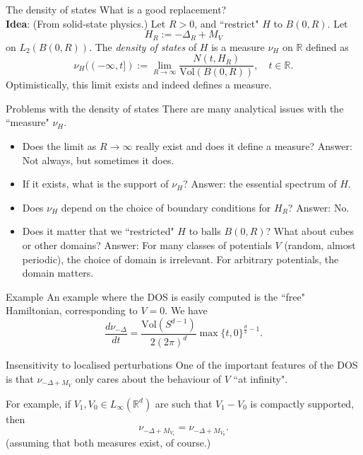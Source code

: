 \documentclass{beamer}
\numberwithin{equation}{section}
\theoremstyle{plain}
\theoremstyle{plain}
\theoremstyle{definition}
\theoremstyle{plain}
\theoremstyle{plain}
\theoremstyle{definition}
\newcommand{\Vol}{\mathrm{Vol}}
\newcommand{\Rl}{\mathbb{R}}
\begin{document}
\begin{frame}{The density of states}
    What is a good replacement?\\
    \pause
    {\bf Idea}: (From solid-state physics.) Let $R > 0$, and ``restrict" $H$ to $B(0,R).$ Let
    \[
        H_R := -\Delta_R + M_{V}
    \]
    on $L_2(B(0,R))$. The \emph{density of states} of $H$ is a measure $\nu_H$ on $\Rl$ defined as
    \[
        \nu_H((-\infty,t]) := \lim_{R\to \infty} \frac{N(t,H_R)}{\mathrm{Vol}(B(0,R))},\quad t \in \Rl.
    \] 
    Optimistically, this limit exists and indeed defines a measure. 
\end{frame}

\begin{frame}{Problems with the density of states}
    There are many analytical issues with the ``measure" $\nu_H$.
    \begin{itemize}
        \item{} Does the limit as $R\to\infty$ really exist and does it define a measure? \pause    Answer: Not always, but sometimes it does. \pause
        \item{} If it exists, what is the support of $\nu_H$? \pause   Answer: the essential spectrum of $H$. \pause
        \item{} Does $\nu_H$ depend on the choice of boundary conditions for $H_R$? \pause   Answer: No. \pause
        \item{} Does it matter that we ``restricted" $H$ to balls $B(0,R)$? What about cubes or other domains? \pause Answer: For many classes of potentials $V$ (random, almost periodic), the choice of domain is irrelevant. For arbitrary potentials, the domain matters.
    \end{itemize}
\end{frame}

\begin{frame}{Example}
    An example where the DOS is easily computed is the ``free" Hamiltonian, corresponding to $V = 0$. We have
    \begin{equation*}
        \frac{d\nu_{-\Delta}}{dt} = \frac{\Vol(S^{d-1})}{2(2\pi)^d}\max\{t,0\}^{\frac{d}{2}-1}.
    \end{equation*}
\end{frame}


\begin{frame}{Insensitivity to localised perturbations}
    One of the important features of the DOS is that $\nu_{-\Delta+M_V}$ only cares about the behaviour of $V$ ``at infinity".\pause
    
    For example, if $V_1,V_0 \in L_{\infty}(\Rl^d)$ are such that $V_1-V_0$ is compactly supported, then 
    \[
        \nu_{-\Delta+M_{V_1}}=\nu_{-\Delta+M_{V_0}}.
    \]
    (assuming that both measures exist, of course.)
\end{frame}
\end{document}
